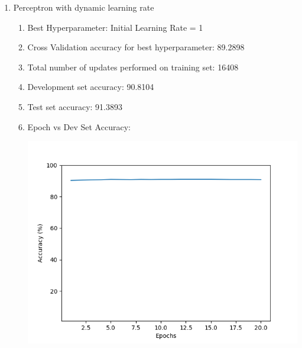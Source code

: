 \begin{enumerate}
\begin{enumerate}
		\item Perceptron with dynamic learning rate
			\begin{enumerate}
				\item Best Hyperparameter: Initial Learning Rate = 1
				\item Cross Validation accuracy for best hyperparameter: 89.2898
				\item Total number of updates performed on training set: 16408
				\item Development set accuracy: 90.8104
				\item Test set accuracy: 91.3893
				\item Epoch vs Dev Set Accuracy:
					\begin{center}
						\includegraphics[scale=0.7]{Dynamic}
					\end{center}
			\end{enumerate}


\end{enumerate}
\end{enumerate}
